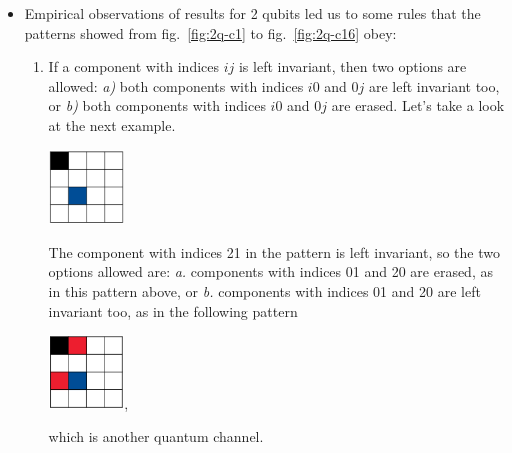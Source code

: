 \documentclass[11pt,dvipsnames]{article} %
\newcommand{\fref}[1]{fig.~\ref{#1}}  \newcommand{\tref}[1]{table~\ref{#1}}
\newcommand{\1}{\mathds{1}}
\begin{document}
\begin{itemize}
\item Empirical observations of results for 2 qubits 
led us to some rules that the
patterns showed from \fref{fig:2q-c1} to \fref{fig:2q-c16} obey:
\begin{enumerate}
\item If a component with indices $ij$ is left invariant, then two options are
allowed: \textit{a)} both components with indices $i0$ and $0j$ are left
invariant too, or \textit{b)} both components with indices $i0$ and $0j$ are
erased.
Let's take a look at the next example. 
\begin{center}
\includegraphics[width=2cm]{img/ex-2q2c-empiricalRule}
\end{center}
The component with indices 21 in the pattern is left invariant,
so the two options allowed are: \textit{a.} components with indices 01 and
20 are erased, as in this pattern above, or \textit{b.} components 
with indices 01 and 20 are left invariant too, 
as in the following pattern 
\begin{center}
\includegraphics[width=2cm]{img/ex-2q4c-empiricalRule},
\end{center}
which is another quantum channel.


\end{enumerate}
\end{itemize}
\end{document}
